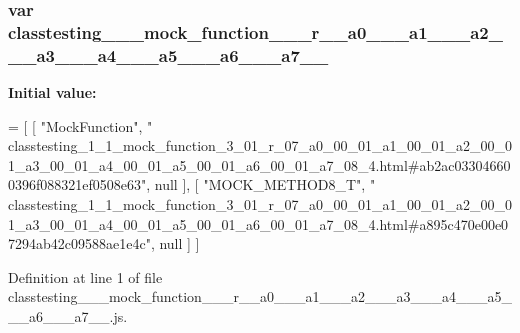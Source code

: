 \subsubsection[{\texorpdfstring{classtesting\+\_\+1\+\_\+1\+\_\+mock\+\_\+function\+\_\+3\+\_\+01\+\_\+r\+\_\+07\+\_\+a0\+\_\+00\+\_\+01\+\_\+a1\+\_\+00\+\_\+01\+\_\+a2\+\_\+00\+\_\+01\+\_\+a3\+\_\+00\+\_\+01\+\_\+a4\+\_\+00\+\_\+01\+\_\+a5\+\_\+00\+\_\+01\+\_\+a6\+\_\+00\+\_\+01\+\_\+a7\+\_\+08\+\_\+4}{classtesting_1_1_mock_function_3_01_r_07_a0_00_01_a1_00_01_a2_00_01_a3_00_01_a4_00_01_a5_00_01_a6_00_01_a7_08_4}}]{\setlength{\rightskip}{0pt plus 5cm}var classtesting\+\_\+\_\+\_\+mock\+\_\+function\+\_\+\_\+\_\+r\+\_\+\_\+a0\+\_\+\_\+\_\+a1\+\_\+\_\+\_\+a2\+\_\+\_\+\_\+a3\+\_\+\_\+\_\+a4\+\_\+\_\+\_\+a5\+\_\+\_\+\_\+a6\+\_\+\_\+\_\+a7\+\_\+\_}\hypertarget{classtesting__1__1__mock__function__3__01__r__07__a0__00__01__a1__00__01__a2__00__01__a3__00__018c0b4b86e3a9a90de958f91b4e453781_a56bf9a162453d2f7c9e99bcbe1853b90}{}\label{classtesting__1__1__mock__function__3__01__r__07__a0__00__01__a1__00__01__a2__00__01__a3__00__018c0b4b86e3a9a90de958f91b4e453781_a56bf9a162453d2f7c9e99bcbe1853b90}
{\bfseries Initial value\+:}
\begin{DoxyCode}
=
[
    [ \textcolor{stringliteral}{"MockFunction"}, \textcolor{stringliteral}{"
      classtesting\_1\_1\_mock\_function\_3\_01\_r\_07\_a0\_00\_01\_a1\_00\_01\_a2\_00\_01\_a3\_00\_01\_a4\_00\_01\_a5\_00\_01\_a6\_00\_01\_a7\_08\_4.html#ab2ac033046600396f088321ef0508e63"}, null ],
    [ \textcolor{stringliteral}{"MOCK\_METHOD8\_T"}, \textcolor{stringliteral}{"
      classtesting\_1\_1\_mock\_function\_3\_01\_r\_07\_a0\_00\_01\_a1\_00\_01\_a2\_00\_01\_a3\_00\_01\_a4\_00\_01\_a5\_00\_01\_a6\_00\_01\_a7\_08\_4.html#a895c470e00e07294ab42c09588ae1e4c"}, null ]
]
\end{DoxyCode}


Definition at line 1 of file classtesting\+\_\+\_\+\_\+mock\+\_\+function\+\_\+\_\+\_\+r\+\_\+\_\+a0\+\_\+\_\+\_\+a1\+\_\+\_\+\_\+a2\+\_\+\_\+\_\+a3\+\_\+\_\+\_\+a4\+\_\+\_\+\_\+a5\+\_\+\_\+\_\+a6\+\_\+\_\+\_\+a7\+\_\+\_.\+js.

